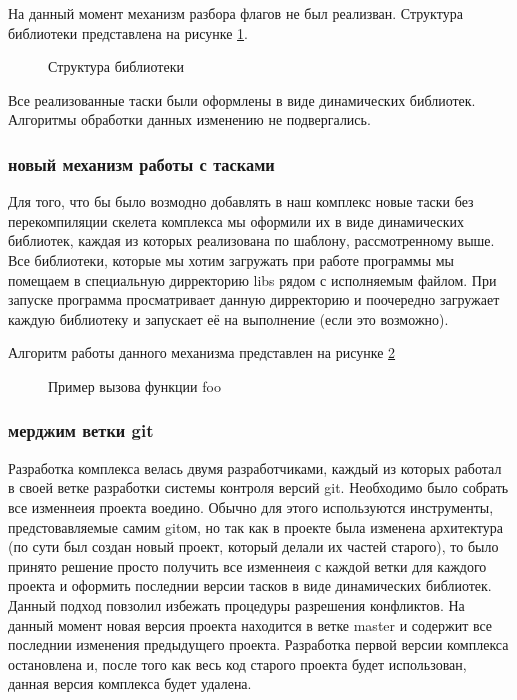 На данный момент механизм разбора флагов не был реализван. Структура библиотеки представлена на рисунке \ref{ris:exampleLib}.

\begin{figure}[ht] 
\caption{Структура библиотеки}
\label{ris:exampleLib}
\end{figure}

Все реализованные таски были оформлены в виде динамических библиотек. Алгоритмы обработки данных изменению не подвергались.

\subsubsection{новый механизм работы с тасками}

Для того, что бы было возмодно добавлять в наш комплекс новые таски без перекомпиляции скелета комплекса мы оформили их в виде динамических библиотек, каждая из которых реализована по шаблону, рассмотренному выше. Все библиотеки, которые мы хотим загружать при работе программы мы помещаем в специальную дирректорию libs рядом с исполняемым файлом. При запуске программа просматривает данную дирректорию и поочередно загружает каждую библиотеку и запускает её на выполнение (если это возможно). 

Алгоритм работы данного механизма представлен на рисунке \ref{ris:initTasks}

\begin{figure}[ht] 
\caption{Пример вызова функции foo}
\label{ris:initTasks}
\end{figure}

\subsubsection{мерджим ветки git}

Разработка комплекса велась двумя разработчиками, каждый из которых работал в своей ветке разработки системы контроля версий git. Необходимо было собрать все изменнеия проекта воедино. Обычно для этого используются инструменты, предстовавляемые самим gitом, но так как в проекте была изменена архитектура (по сути был создан новый проект, который делали их частей старого), то было принято решение просто получить все изменнеия с каждой ветки для каждого проекта и оформить последнии версии тасков в виде динамических библиотек. Данный подход повзолил избежать процедуры разрешения конфликтов. На данный момент новая версия проекта находится в ветке master и содержит все последнии изменения предыдущего проекта. Разработка первой версии комплекса остановлена и, после того как весь код старого проекта будет использован, данная версия комплекса будет удалена.
